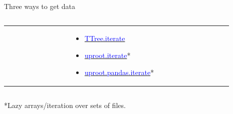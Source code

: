 \documentclass[aspectratio=169]{beamer}
\begin{document}
\begin{frame}{Three ways to get data}
\begin{columns}
\begin{tabular}{p{0.29\linewidth} c p{0.29\linewidth} c p{0.31\linewidth}}
\begin{minipage}{\linewidth}
\begin{itemize}
\end{itemize}
\end{minipage} & &
\begin{minipage}{\linewidth}
\vspace{0.5\baselineskip}
\begin{itemize}
\item \href{https://uproot.readthedocs.io/en/latest/ttree-handling.html\#iterate}{\textcolor{blue}{TTree.iterate}}
\item \href{https://uproot.readthedocs.io/en/latest/opening-files.html\#uproot-iterate}{\textcolor{blue}{uproot.iterate}}*
\item \href{https://uproot.readthedocs.io/en/latest/opening-files.html\#uproot-pandas-iterate}{\textcolor{blue}{uproot.pandas.iterate}}*
\vspace{2.7\baselineskip}
\end{itemize}
\end{minipage}
\end{tabular}
\end{columns}

\vspace{0.5 cm}
*Lazy arrays/iteration over sets of files.
\end{frame}
\end{document}
